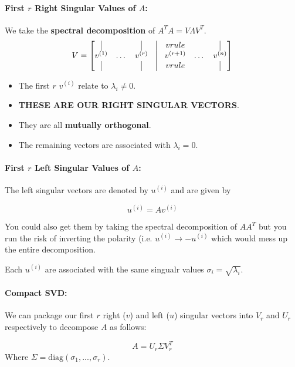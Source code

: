 \documentclass[a4paper,12pt]{report}
\begin{document}
\paragraph{First $r$ Right Singular Values of $A$: } We take the \textbf{spectral decomposition} 
of $A^TA = V\Lambda V^T$.
\begin{equation}
V = 
\begin{bmatrix}
	\vrule & & \vrule & \vrule & vrule & & \vrule \\
	v^{(1)} & \dots & v^{(r)} & \vrule & v^{(r+1)} & \dots & v^{(n)} \\
	\vrule & & \vrule & \vrule & vrule & & \vrule 
\end{bmatrix}
\end{equation}
\begin{itemize}
\item The first $r$ $v^{(i)}$ relate to $\lambda_i \neq 0$.
\item \textbf{THESE ARE OUR RIGHT SINGULAR VECTORS}.
\item They are all \textbf{mutually orthogonal}.
\item The remaining vectors are associated with $\lambda_i = 0$.
\end{itemize}

\paragraph{First $r$ Left Singular Values of $A$: } The left singular vectors are denoted by $u^{(i)}$ and are given by

\begin{equation}
	u^{(i)} = Av^{(i)}
\end{equation}

You could also get them by taking the spectral decomposition of $AA^T$ but you run the risk of inverting the polarity (i.e. $u^{(i)} \to -u^{(i)}$ which would mess up the entire decomposition.

Each $u^{(i)}$ are associated with the same singualr values $\sigma_i = \sqrt{\lambda_i}$.

\paragraph{Compact SVD: } We can package our first $r$ right ($v$) and left ($u$) singular vectors into $V_r$ and $U_r$ respectively to decompose $A$ as follows:

\begin{equation}
	A = U_r \Sigma V_r^T
\end{equation}
Where $\Sigma = \text{diag}(\sigma_1, ..., \sigma_r)$. 
\end{document}
